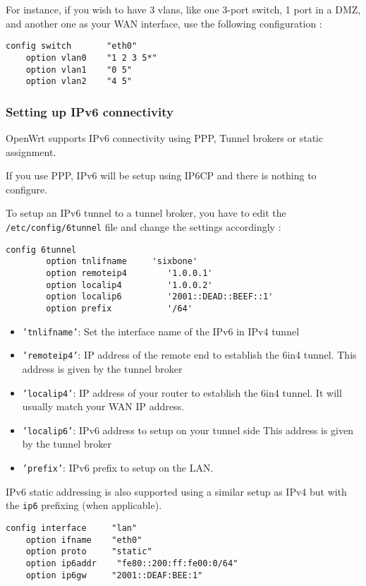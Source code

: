 For instance, if you wish to have 3 vlans, like one 3-port switch, 1 port in a
DMZ, and another one as your WAN interface, use the following configuration :

\begin{Verbatim}
config switch       "eth0"
    option vlan0    "1 2 3 5*"
    option vlan1    "0 5"
    option vlan2    "4 5"
\end{Verbatim}

\subsubsection{Setting up IPv6 connectivity}

OpenWrt supports IPv6 connectivity using PPP, Tunnel brokers or static
assignment.

If you use PPP, IPv6 will be setup using IP6CP and there is nothing to
configure.

To setup an IPv6 tunnel to a tunnel broker, you have to edit the
\texttt{/etc/config/6tunnel} file and change the settings accordingly :

\begin{Verbatim}
config 6tunnel
        option tnlifname     'sixbone'
        option remoteip4        '1.0.0.1'
        option localip4         '1.0.0.2'
        option localip6         '2001::DEAD::BEEF::1'
        option prefix           '/64'
\end{Verbatim}

\begin{itemize}
    \item{\texttt{'tnlifname'}:}
        Set the interface name of the IPv6 in IPv4 tunnel
    \item{\texttt{'remoteip4'}:}
        IP address of the remote end to establish the 6in4 tunnel.
	This address is given by the tunnel broker
    \item{\texttt{'localip4'}:}
	IP address of your router to establish the 6in4 tunnel.
	It will usually match your WAN IP address.
    \item{\texttt{'localip6'}:}
	IPv6 address to setup on your tunnel side
	This address is given by the tunnel broker
    \item{\texttt{'prefix'}:}
	IPv6 prefix to setup on the LAN.
\end{itemize}

IPv6 static addressing is also supported using a similar setup as
IPv4 but with the \texttt{ip6} prefixing (when applicable).

\begin{Verbatim}
config interface     "lan"
    option ifname    "eth0"
    option proto     "static"
    option ip6addr    "fe80::200:ff:fe00:0/64"
    option ip6gw     "2001::DEAF:BEE:1"
\end{Verbatim}
